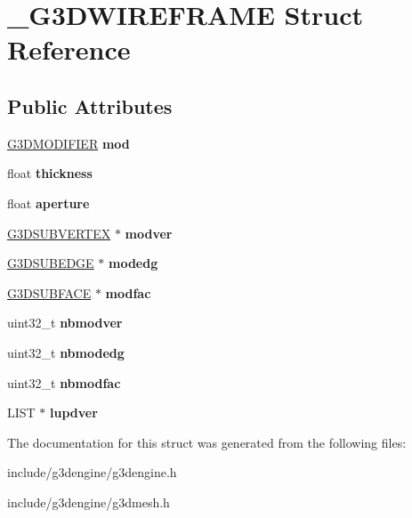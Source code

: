 \hypertarget{struct__G3DWIREFRAME}{}\section{\+\_\+\+G3\+D\+W\+I\+R\+E\+F\+R\+A\+ME Struct Reference}
\label{struct__G3DWIREFRAME}
\subsection*{Public Attributes}
\begin{DoxyCompactItemize}
\item 
\mbox{\label{struct__G3DWIREFRAME_a7f2df6af5c54054840803133c3c39571}} 
\hyperlink{struct__G3DMODIFIER}{G3\+D\+M\+O\+D\+I\+F\+I\+ER} {\bfseries mod}
\item 
\mbox{\label{struct__G3DWIREFRAME_a5a899fadd9abba9f054193f23534abdf}} 
float {\bfseries thickness}
\item 
\mbox{\label{struct__G3DWIREFRAME_a251ba3057561e22fa833fb1736f36c35}} 
float {\bfseries aperture}
\item 
\mbox{\label{struct__G3DWIREFRAME_ac909818c89634480001b68f823c273a1}} 
\hyperlink{struct__G3DINNERVERTEX}{G3\+D\+S\+U\+B\+V\+E\+R\+T\+EX} $\ast$ {\bfseries modver}
\item 
\mbox{\label{struct__G3DWIREFRAME_af5b9e717db95773dbed36a1eacb6bae8}} 
\hyperlink{struct__G3DSUBEDGE}{G3\+D\+S\+U\+B\+E\+D\+GE} $\ast$ {\bfseries modedg}
\item 
\mbox{\label{struct__G3DWIREFRAME_a4b0b6ad6aff142162c2e3f8fa78cd7ff}} 
\hyperlink{struct__G3DSUBFACE}{G3\+D\+S\+U\+B\+F\+A\+CE} $\ast$ {\bfseries modfac}
\item 
\mbox{\label{struct__G3DWIREFRAME_a06026b19f32ce9f5f98eb24943d6e6a6}} 
uint32\+\_\+t {\bfseries nbmodver}
\item 
\mbox{\label{struct__G3DWIREFRAME_acad6bf5c7933802f4cd410725836e3a9}} 
uint32\+\_\+t {\bfseries nbmodedg}
\item 
\mbox{\label{struct__G3DWIREFRAME_abde99951a32803254352119185cbccd0}} 
uint32\+\_\+t {\bfseries nbmodfac}
\item 
\mbox{\label{struct__G3DWIREFRAME_a4062929a40cf3a85500bd311e8283759}} 
L\+I\+ST $\ast$ {\bfseries lupdver}
\end{DoxyCompactItemize}


The documentation for this struct was generated from the following files\+:\begin{DoxyCompactItemize}
\item 
include/g3dengine/g3dengine.\+h\item 
include/g3dengine/g3dmesh.\+h\end{DoxyCompactItemize}
